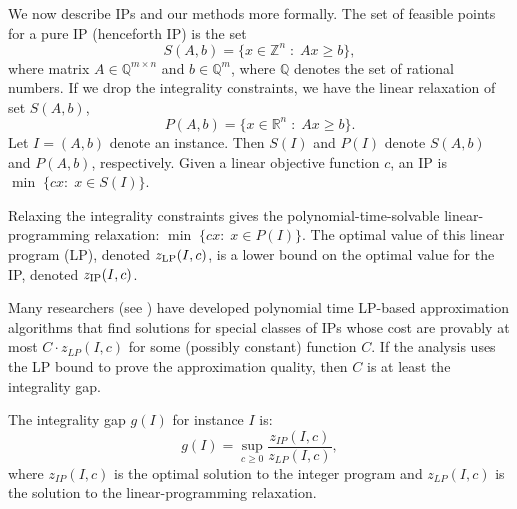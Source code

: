 We now describe IPs and our methods more formally. The set of feasible points for a pure IP (henceforth IP) is the set
\begin{equation}
S(A,b)= \{x\in \mathbb{Z}^{n}\;:\; Ax\geq b\}  \label{S},
\end{equation}
where matrix $A\in \mathbb{Q}^{m\times n}$ and $b \in \mathbb{Q}^{m}$, where $\mathbb{Q}$ denotes the set of rational numbers. If we drop the integrality constraints, we have the linear relaxation of set $S(A,b)$,
\begin{equation}
P(A,b) = \{x\in \mathbb{R}^{n}\;:\; Ax\geq b\}. \label{P}
\end{equation}
Let $I=(A,b)$ denote an instance. Then $S(I)$ and $P(I)$ denote $S(A,b)$ and $P(A,b)$, respectively. Given a linear objective function $c$, an IP is $\min \;\{cx:\; x \in S(I)\}$. 

Relaxing the integrality constraints gives the polynomial-time-solvable linear-programming relaxation: $\min \;\{cx:\;x\in P(I) \}$.  The optimal value of this linear program (LP), denoted $z_{\operatorname{LP}}(I,c)$, is a lower bound on the optimal value for the IP, denoted $z_{\operatorname{IP}}(I,c)$. 

Many researchers (see \cite{davids,vazirani}) have developed polynomial time LP-based approximation algorithms that find solutions for special classes of IPs whose cost are provably at most $C\cdot z_{LP}(I,c)$ for some (possibly constant) function $C$. If the analysis uses the LP bound to prove the approximation quality, then $C$ is at least the integrality gap.
\begin{definition}
The integrality gap $g(I)$ for instance $I$ is: $$g(I)= \sup_{c\geq 0}\frac{z_{IP}(I,c)}{z_{LP}(I,c)},$$
where $z_{IP}(I,c)$ is the optimal solution to the integer program and $z_{LP}(I,c)$ is the solution to the linear-programming relaxation.
\end{definition}

